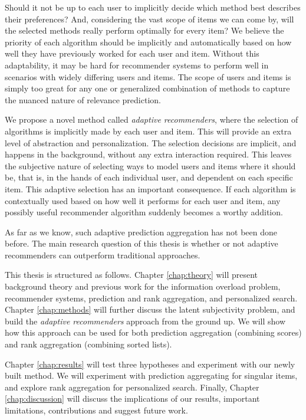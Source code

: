 Should it not be up to each user to implicitly decide which method best describes their preferences?
And, considering the vast scope of items we can come by, will the selected
methods really perform optimally for every item?
We believe the priority of each algorithm should be implicitly and automatically
based on how well they have previously worked for each user and item.
Without this adaptability, it may be hard for recommender systems
to perform well in scenarios with widely differing users and items.
The scope of users and items is simply too great for any one or generalized combination
of methods to capture the nuanced nature of relevance prediction.

We propose a novel method called \emph{adaptive recommenders}, 
where the selection of algorithms is implicitly made by each user and item.
This will provide an extra level of abstraction and personalization.
The selection decisions are implicit, and happens in the background, without any extra interaction required.
This leaves the subjective nature of selecting ways to model users and items where it should be,
that is, in the hands of each individual user, and dependent on each specific item.
This adaptive selection has an important consequence. 
If each algorithm is contextually used based on how well it performs for each user and item,
any possibly useful recommender algorithm suddenly becomes a worthy addition.

As far as we know, such adaptive prediction aggregation has not been done before.
The main research question of this thesis is whether or not adaptive recommenders
can outperform traditional approaches.

\hr

\noindent
This thesis is structured as follows.
Chapter \ref{chap:theory} will present background theory and previous work for
the information overload problem, recommender systems, 
prediction and rank aggregation, and personalized search. 
Chapter \ref{chap:methods} will further discuss the latent subjectivity problem,
and build the \emph{adaptive recommenders} approach from the ground up.
We will show how this approach can be used for both prediction aggregation
(combining scores) and rank aggregation (combining sorted lists).

Chapter \ref{chap:results} will test three hypotheses and experiment with our newly built method.
We will experiment with prediction aggregating for singular items, and explore rank aggregation for personalized search.
Finally, Chapter \ref{chap:discussion} will discuss the implications of our results,
important limitations, contributions and suggest future work.

